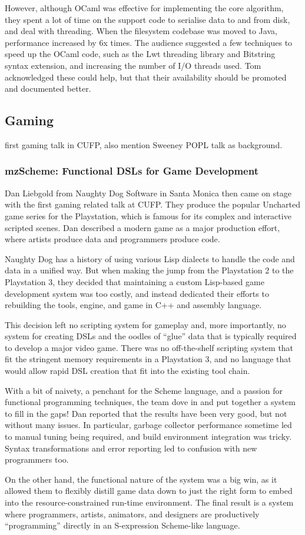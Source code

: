 \documentclass{jfp1}
\begin{document}
However, although OCaml was effective for implementing the core algorithm, they
spent a lot of time on the support code to serialise data to and from disk, and
deal with threading. When the filesystem codebase was moved to Java,
performance increased by 6x times. The audience suggested a few techniques to
speed up the OCaml code, such as the Lwt threading library and Bitstring syntax
extension, and increasing the number of I/O threads used. Tom acknowledged
these could help, but that their availability should be promoted and documented
better. 

\subsection{Gaming}

first gaming talk in CUFP, also mention Sweeney POPL talk as background.

\subsubsection{mzScheme: Functional DSLs for Game Development}

Dan Liebgold from Naughty Dog Software in Santa Monica then came on stage with
the first gaming related talk at CUFP. They produce the popular Uncharted game
series for the Playstation, which is famous for its complex and interactive
scripted scenes.  Dan described a modern game as a major production effort, where
artists produce data and programmers produce code.

Naughty Dog has a history of using various Lisp dialects to handle the code and
data in a unified way. But when making the jump from the Playstation 2 to the
Playstation 3, they decided that maintaining a custom Lisp-based game
development system was too costly, and instead dedicated their efforts to
rebuilding the tools, engine, and game in C++ and assembly language.

This decision left no scripting system for gameplay and, more importantly, no
system for creating DSLs and the oodles of “glue” data that is typically
required to develop a major video game. There was no off-the-shelf scripting
system that fit the stringent memory requirements in a Playstation 3, and no
language that would allow rapid DSL creation that fit into the existing tool
chain.

With a bit of naivety, a penchant for the Scheme language, and a passion for
functional programming techniques, the team dove in and put together a system
to fill in the gaps!  Dan reported that the results have been very good, but
not without many issues.  In particular, garbage collector performance sometime
led to manual tuning being required, and build environment integration was
tricky. Syntax transformations and error reporting led to confusion with new
programmers too. 

On the other hand, the functional nature of the system was a big win, as it
allowed them to flexibly distill game data down to just the right form to embed
into the resource-constrained run-time environment.  The final result is a
system where programmers, artists, animators, and designers are productively
``programming'' directly in an S-expression Scheme-like language.
\end{document}
